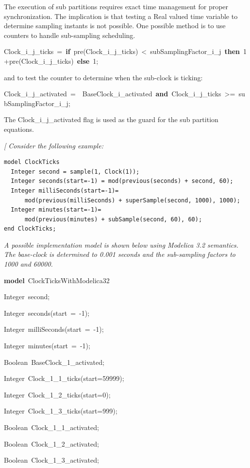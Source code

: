 \documentclass[10pt,a4paper]{report}
\begin{document}
The execution of sub partitions requires exact time management for
proper synchronization. The implication is that testing a Real valued
time variable to determine sampling instants is not possible. One
possible method is to use counters to handle sub-sampling scheduling.

Clock\_i\_j\_ticks~=~\textbf{if}~pre(Clock\_i\_j\_ticks)~\textless{}~subSamplingFactor\_i\_j~\textbf{then}~1+pre(Clock\_i\_j\_ticks)~\textbf{else}~1;

and to test the counter to determine when the sub-clock is ticking:

Clock\_i\_j\_activated~=~~BaseClock\_i\_activated~\textbf{and}~Clock\_i\_j\_ticks~\textgreater{}=~subSamplingFactor\_i\_j;

The Clock\_i\_j\_activated flag is used as the guard for the sub
partition equations.

\emph{{[} Consider the following example:}

\begin{lstlisting}[language=modelica]
model ClockTicks
  Integer second = sample(1, Clock(1));
  Integer seconds(start=-1) = mod(previous(seconds) + second, 60);
  Integer milliSeconds(start=-1)=
      mod(previous(milliSeconds) + superSample(second, 1000), 1000);
  Integer minutes(start=-1)=
      mod(previous(minutes) + subSample(second, 60), 60);
end ClockTicks;
\end{lstlisting}

\emph{A possible implementation model is shown below using Modelica 3.2
semantics. The base-clock is determined to 0.001 seconds and the
sub-sampling factors to 1000 and 60000.}

\textbf{model}~ClockTicksWithModelica32

Integer~second;

Integer~seconds(start~=~-1);

Integer~milliSeconds(start~=~-1);

Integer~minutes(start~=~-1);

Boolean~BaseClock\_1\_activated;

Integer~Clock\_1\_1\_ticks(start=59999);

Integer~Clock\_1\_2\_ticks(start=0);

Integer~Clock\_1\_3\_ticks(start=999);

Boolean~Clock\_1\_1\_activated;

Boolean~Clock\_1\_2\_activated;

Boolean~Clock\_1\_3\_activated;
\end{document}
